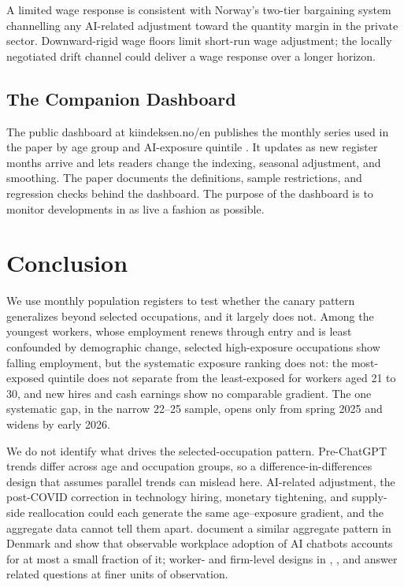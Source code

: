 \documentclass[12pt]{article}
\begin{document}
A limited wage response is consistent with Norway's two-tier bargaining system \citep{bhuller2022} channelling any AI-related adjustment toward the quantity margin in the private sector. Downward-rigid wage floors limit short-run wage adjustment; the locally negotiated drift channel could deliver a wage response over a longer horizon. 

\subsection{The Companion Dashboard}\label{sec:discussion:dashboard}

The public dashboard at kiindeksen.no/en publishes the monthly series used in the paper by age group and AI-exposure quintile \citep{kiindeksen2026}. It updates as new register months arrive and lets readers change the indexing, seasonal adjustment, and smoothing. The paper documents the definitions, sample restrictions, and regression checks behind the dashboard. The purpose of the dashboard is to monitor developments in as live a fashion as possible. 

\section{Conclusion}
\label{sec:conclusion}

We use monthly population registers to test whether the canary pattern generalizes beyond selected occupations, and it largely does not. Among the youngest workers, whose employment renews through entry and is least confounded by demographic change, selected high-exposure occupations show falling employment, but the systematic exposure ranking does not: the most-exposed quintile does not separate from the least-exposed for workers aged 21 to 30, and new hires and cash earnings show no comparable gradient. The one systematic gap, in the narrow 22--25 sample, opens only from spring 2025 and widens by early 2026.

We do not identify what drives the selected-occupation pattern. Pre-ChatGPT trends differ across age and occupation groups, so a difference-in-differences design that assumes parallel trends can mislead here. AI-related adjustment, the post-COVID correction in technology hiring, monetary tightening, and supply-side reallocation could each generate the same age--exposure gradient, and the aggregate data cannot tell them apart. \citet{humlum2026} document a similar aggregate pattern in Denmark and show that observable workplace adoption of AI chatbots accounts for at most a small fraction of it; worker- and firm-level designs in \citet{brynjolfsson2025}, \citet{lodefalk2026}, and \citet{humlum2026} answer related questions at finer units of observation.
\end{document}
